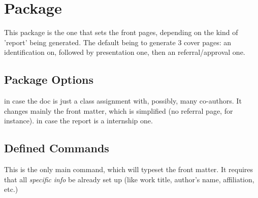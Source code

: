 \documentclass[dctools,english]{ufrgscca} %
\begin{document}
\section{ Package}
This package is the one that sets the front pages, depending on the kind of 'report' being generated. The default being to generate 3 cover pages: an identification on, followed by presentation one, then an referral/approval one.

\subsection{Package Options}
\begin{Options}
	 in case the doc is just a class assignment with, possibly, many co-authors. It changes mainly the front matter, which is simplified (no referral page, for instance).
	 in case the report is a internship one.
\end{Options}

\subsection{Defined Commands}
\begin{Macros}{\maketitle}
	\begin{Syntax}%
		\Macro{\maketitle}{}
	\end{Syntax}
This is the only main command, which will typeset the front matter. It requires that all \emph{specific info} be already set up (like work title, author's name, affiliation, etc.)
\end{Macros}


\end{document}
